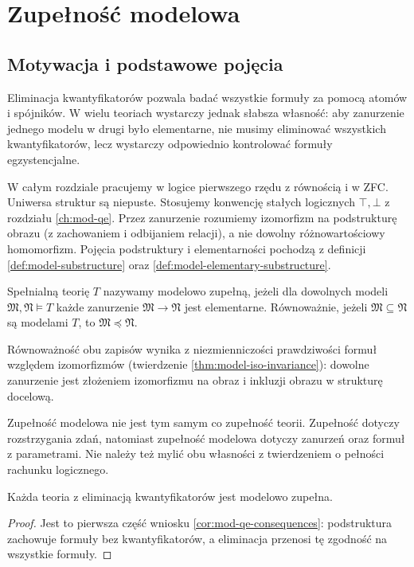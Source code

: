 \chapter{Zupełność modelowa}
\label{ch:mod-model-completeness}
\section{Motywacja i podstawowe pojęcia}
Eliminacja kwantyfikatorów pozwala badać wszystkie formuły
za pomocą atomów i spójników. W wielu teoriach wystarczy
jednak słabsza własność: aby zanurzenie jednego modelu
w drugi było elementarne, nie musimy eliminować wszystkich
kwantyfikatorów, lecz wystarczy odpowiednio kontrolować
formuły egzystencjalne.

W całym rozdziale pracujemy w logice pierwszego rzędu
z równością i w ZFC. Uniwersa struktur są niepuste.
Stosujemy konwencję stałych logicznych $\top,\bot$
z rozdziału \ref{ch:mod-qe}.
Przez zanurzenie rozumiemy izomorfizm na podstrukturę
obrazu (z zachowaniem i odbijaniem relacji), a nie
dowolny różnowartościowy homomorfizm. Pojęcia
podstruktury i elementarności pochodzą z definicji
\ref{def:model-substructure} oraz
\ref{def:model-elementary-substructure}.

\begin{definicja}
\label{def:mod-model-complete}
Spełnialną teorię $T$ nazywamy modelowo zupełną, jeżeli
dla dowolnych modeli $\mathfrak M,\mathfrak N\models T$
każde zanurzenie $\mathfrak M\to\mathfrak N$ jest
elementarne. Równoważnie, jeżeli
$\mathfrak M\subseteq\mathfrak N$ są modelami $T$,
to $\mathfrak M\preccurlyeq\mathfrak N$.
\end{definicja}

Równoważność obu zapisów wynika z niezmienniczości
prawdziwości formuł względem izomorfizmów
(twierdzenie \ref{thm:model-iso-invariance}):
dowolne zanurzenie jest złożeniem izomorfizmu na obraz
i inkluzji obrazu w strukturę docelową.

Zupełność modelowa nie jest tym samym co zupełność teorii.
Zupełność dotyczy rozstrzygania zdań, natomiast zupełność
modelowa dotyczy zanurzeń oraz formuł z parametrami.
Nie należy też mylić obu własności z twierdzeniem
o pełności rachunku logicznego.

\begin{wniosek}
\label{cor:mod-mc-qe}
Każda teoria z eliminacją kwantyfikatorów jest
modelowo zupełna.
\end{wniosek}
\begin{proof}
Jest to pierwsza część wniosku
\ref{cor:mod-qe-consequences}: podstruktura zachowuje
formuły bez kwantyfikatorów, a eliminacja przenosi
tę zgodność na wszystkie formuły.
\end{proof}


